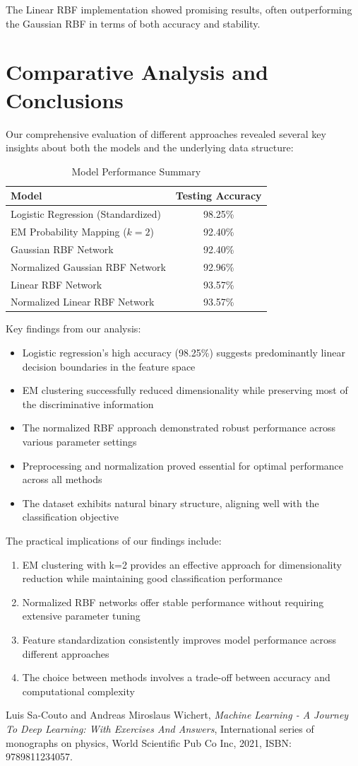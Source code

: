 \documentclass[11pt]{article}
\begin{document}
The Linear RBF implementation showed promising results, often outperforming the Gaussian RBF in terms of both accuracy and stability.

\section{Comparative Analysis and Conclusions}

Our comprehensive evaluation of different approaches revealed several key insights about both the models and the underlying data structure:

\begin{table}[H]
\centering
\caption{Model Performance Summary}
\begin{tabular}{@{}lc@{}}
\toprule
Model                              & Testing Accuracy \\ \midrule
Logistic Regression (Standardized) & 98.25\%          \\
EM Probability Mapping ($k=2$)     & 92.40\%          \\
Gaussian RBF Network               & 92.40\%          \\
Normalized Gaussian RBF Network    & 92.96\%          \\
Linear RBF Network                 & 93.57\%          \\
Normalized Linear RBF Network      & 93.57\%          \\ \bottomrule
\end{tabular}
\end{table}

Key findings from our analysis:
\begin{itemize}
    \item Logistic regression's high accuracy (98.25\%) suggests predominantly linear decision boundaries in the feature space
    \item EM clustering successfully reduced dimensionality while preserving most of the discriminative information
    \item The normalized RBF approach demonstrated robust performance across various parameter settings
    \item Preprocessing and normalization proved essential for optimal performance across all methods
    \item The dataset exhibits natural binary structure, aligning well with the classification objective
\end{itemize}

The practical implications of our findings include:
\begin{enumerate}
    \item EM clustering with k=2 provides an effective approach for dimensionality reduction while maintaining good classification performance
    \item Normalized RBF networks offer stable performance without requiring extensive parameter tuning
    \item Feature standardization consistently improves model performance across different approaches
    \item The choice between methods involves a trade-off between accuracy and computational complexity
\end{enumerate}


Luis Sa-Couto and Andreas Miroslaus Wichert, 
\textit{Machine Learning - A Journey To Deep Learning: With Exercises And Answers}, 
International series of monographs on physics, 
World Scientific Pub Co Inc, 2021, ISBN: 9789811234057.

\end{document}
